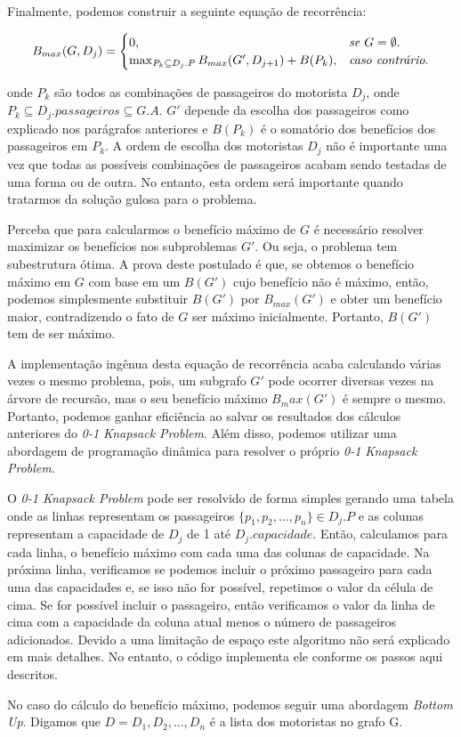 \documentclass{article}
\begin{document}
Finalmente, podemos construir a seguinte equação de recorrência:

\begin{equation}
  B_{max}(G, D_{j}) = 
  \begin{cases}
    0, & \textit{se $ G = \emptyset $}.\\
    \max_{P_k \subseteq D_j.P} B_{max}(G', D_{j+1}) + B(P_k), & \textit{caso contrário}.\\
  \end{cases}
\end{equation}

onde $ P_k $ são todos as combinações de passageiros do motorista $ D_j $, onde $ P_k \subseteq D_j.passageiros \subseteq G.A $.
$ G' $ depende da escolha dos passageiros como explicado nos parágrafos anteriores e $ B(P_k) $ é o somatório dos benefícios
dos passageiros em $ P_k $. A ordem de escolha dos motoristas $ D_j $ não é importante uma vez que todas as possíveis combinações de
passageiros acabam sendo testadas de uma forma ou de outra. No entanto, esta ordem será importante quando tratarmos da solução gulosa para o problema.

Perceba que para calcularmos o benefício máximo de $ G $ é necessário resolver maximizar os benefícios nos subproblemas $ G' $. 
Ou seja, o problema tem subestrutura ótima. A prova deste postulado é que, se obtemos o benefício máximo em $ G $ com base
em um $ B(G') $ cujo benefício não é máximo, então, podemos simplesmente substituir $ B(G') $ por $ B_{max}(G') $ e obter um benefício
maior, contradizendo o fato de $ G $ ser máximo inicialmente. Portanto, $ B(G') $ tem de ser máximo.

A implementação ingênua desta equação de recorrência acaba calculando várias vezes o mesmo problema, pois, um subgrafo $ G' $ pode ocorrer
diversas vezes na árvore de recursão, mas o seu benefício máximo $ B_max(G') $ é sempre o mesmo. Portanto, podemos ganhar eficiência ao
salvar os resultados dos cálculos anteriores do \textit{0-1 Knapsack Problem}. Além disso, podemos utilizar uma abordagem de programação
dinâmica para resolver o próprio \textit{0-1 Knapsack Problem}.

O \textit{0-1 Knapsack Problem} pode ser resolvido de forma simples gerando uma tabela onde as linhas representam os passageiros
$ \{ p_1, p_2, ..., p_n\} \in D_j.P $ e as colunas representam a capacidade de $ D_j $ de 1 até $ D_j.capacidade $. Então, calculamos
para cada linha, o benefício máximo com cada uma das colunas de capacidade. Na próxima linha, verificamos se podemos incluir o próximo passageiro 
para cada uma das capacidades e, se isso não for possível, repetimos o valor da célula de cima. Se for possível incluir o passageiro, então
verificamos o valor da linha de cima com a capacidade da coluna atual menos o número de passageiros adicionados. Devido a uma limitação
de espaço este algoritmo não será explicado em mais detalhes. No entanto, o código implementa ele conforme os passos aqui descritos.

No caso do cálculo do benefício máximo, podemos seguir uma abordagem \textit{Bottom Up}. Digamos que $ D = {D_1, D_2, ..., D_n} $ é
a lista dos motoristas no grafo G.
\end{document}
